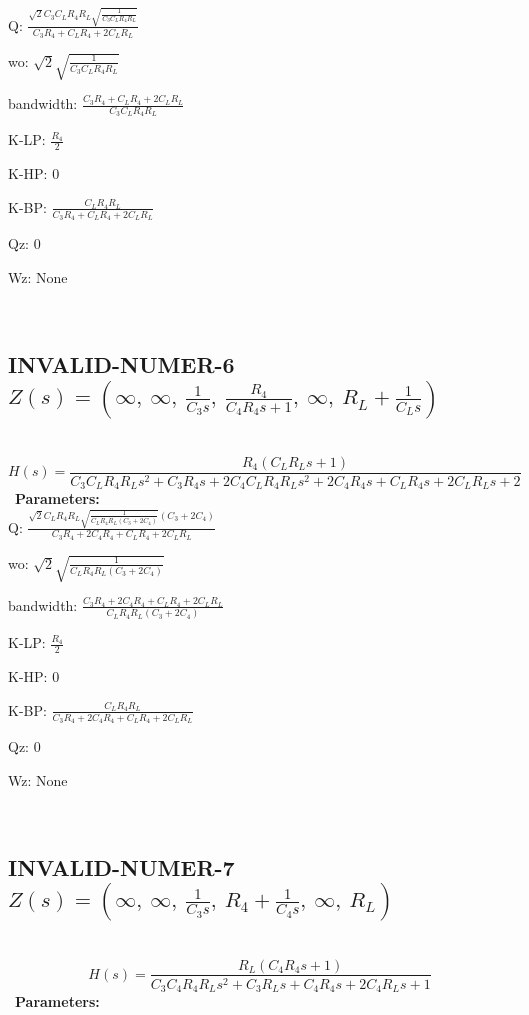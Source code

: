 \documentclass{article}
\begin{document}
Q: $\frac{\sqrt{2} C_{3} C_{L} R_{4} R_{L} \sqrt{\frac{1}{C_{3} C_{L} R_{4} R_{L}}}}{C_{3} R_{4} + C_{L} R_{4} + 2 C_{L} R_{L}}$\ 

wo: $\sqrt{2} \sqrt{\frac{1}{C_{3} C_{L} R_{4} R_{L}}}$\ 

bandwidth: $\frac{C_{3} R_{4} + C_{L} R_{4} + 2 C_{L} R_{L}}{C_{3} C_{L} R_{4} R_{L}}$\ 

K-LP: $\frac{R_{4}}{2}$\ 

K-HP: $0$\ 

K-BP: $\frac{C_{L} R_{4} R_{L}}{C_{3} R_{4} + C_{L} R_{4} + 2 C_{L} R_{L}}$\ 

Qz: $0$\ 

Wz: $\text{None}$\ 

\ 

\subsection{INVALID-NUMER-6 $Z(s) = \left( \infty, \  \infty, \  \frac{1}{C_{3} s}, \  \frac{R_{4}}{C_{4} R_{4} s + 1}, \  \infty, \  R_{L} + \frac{1}{C_{L} s}\right)$ } \ 
\textbf{\[H(s) = \frac{R_{4} \left(C_{L} R_{L} s + 1\right)}{C_{3} C_{L} R_{4} R_{L} s^{2} + C_{3} R_{4} s + 2 C_{4} C_{L} R_{4} R_{L} s^{2} + 2 C_{4} R_{4} s + C_{L} R_{4} s + 2 C_{L} R_{L} s + 2}\] } \ 
\textbf{Parameters:}\\ 

Q: $\frac{\sqrt{2} C_{L} R_{4} R_{L} \sqrt{\frac{1}{C_{L} R_{4} R_{L} \left(C_{3} + 2 C_{4}\right)}} \left(C_{3} + 2 C_{4}\right)}{C_{3} R_{4} + 2 C_{4} R_{4} + C_{L} R_{4} + 2 C_{L} R_{L}}$\ 

wo: $\sqrt{2} \sqrt{\frac{1}{C_{L} R_{4} R_{L} \left(C_{3} + 2 C_{4}\right)}}$\ 

bandwidth: $\frac{C_{3} R_{4} + 2 C_{4} R_{4} + C_{L} R_{4} + 2 C_{L} R_{L}}{C_{L} R_{4} R_{L} \left(C_{3} + 2 C_{4}\right)}$\ 

K-LP: $\frac{R_{4}}{2}$\ 

K-HP: $0$\ 

K-BP: $\frac{C_{L} R_{4} R_{L}}{C_{3} R_{4} + 2 C_{4} R_{4} + C_{L} R_{4} + 2 C_{L} R_{L}}$\ 

Qz: $0$\ 

Wz: $\text{None}$\ 

\ 

\subsection{INVALID-NUMER-7 $Z(s) = \left( \infty, \  \infty, \  \frac{1}{C_{3} s}, \  R_{4} + \frac{1}{C_{4} s}, \  \infty, \  R_{L}\right)$ } \ 
\textbf{\[H(s) = \frac{R_{L} \left(C_{4} R_{4} s + 1\right)}{C_{3} C_{4} R_{4} R_{L} s^{2} + C_{3} R_{L} s + C_{4} R_{4} s + 2 C_{4} R_{L} s + 1}\] } \ 
\textbf{Parameters:}\\ 
\end{document}
